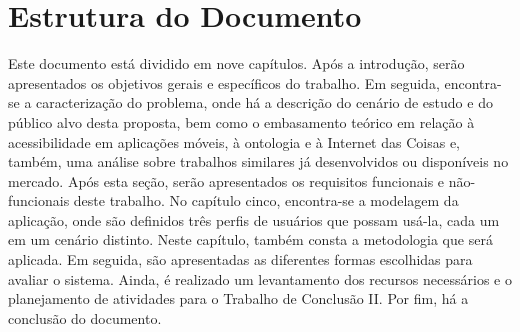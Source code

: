 \section{Estrutura do Documento}
Este documento está dividido em nove capítulos. Após a introdução, serão apresentados os objetivos gerais e específicos do trabalho. Em seguida, encontra-se a caracterização do problema, onde há a descrição do cenário de estudo e do público alvo desta proposta, bem como o embasamento teórico em relação à acessibilidade em aplicações móveis, à ontologia e à Internet das Coisas e, também, uma análise sobre trabalhos similares já desenvolvidos ou disponíveis no mercado. Após esta seção, serão apresentados os requisitos funcionais e não-funcionais deste trabalho. No capítulo cinco, encontra-se a modelagem da aplicação, onde são definidos três perfis de usuários que possam usá-la, cada um em um cenário distinto. Neste capítulo, também consta a metodologia que será aplicada. Em seguida, são apresentadas as diferentes formas escolhidas para avaliar o sistema. Ainda, é realizado um levantamento dos recursos necessários e o planejamento de atividades para o Trabalho de Conclusão II. Por fim, há a conclusão do documento.

